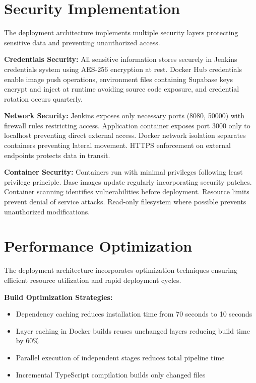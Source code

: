 \section{Security Implementation}

The deployment architecture implements multiple security layers protecting sensitive data and preventing unauthorized access.

\textbf{Credentials Security:} All sensitive information stores securely in Jenkins credentials system using AES-256 encryption at rest. Docker Hub credentials enable image push operations, environment files containing Supabase keys encrypt and inject at runtime avoiding source code exposure, and credential rotation occurs quarterly.

\textbf{Network Security:} Jenkins exposes only necessary ports (8080, 50000) with firewall rules restricting access. Application container exposes port 3000 only to localhost preventing direct external access. Docker network isolation separates containers preventing lateral movement. HTTPS enforcement on external endpoints protects data in transit.

\textbf{Container Security:} Containers run with minimal privileges following least privilege principle. Base images update regularly incorporating security patches. Container scanning identifies vulnerabilities before deployment. Resource limits prevent denial of service attacks. Read-only filesystem where possible prevents unauthorized modifications.

\section{Performance Optimization}

The deployment architecture incorporates optimization techniques ensuring efficient resource utilization and rapid deployment cycles.

\textbf{Build Optimization Strategies:}
\begin{itemize}
\item Dependency caching reduces installation time from 70 seconds to 10 seconds
\item Layer caching in Docker builds reuses unchanged layers reducing build time by 60\%
\item Parallel execution of independent stages reduces total pipeline time
\item Incremental TypeScript compilation builds only changed files
\end{itemize}

